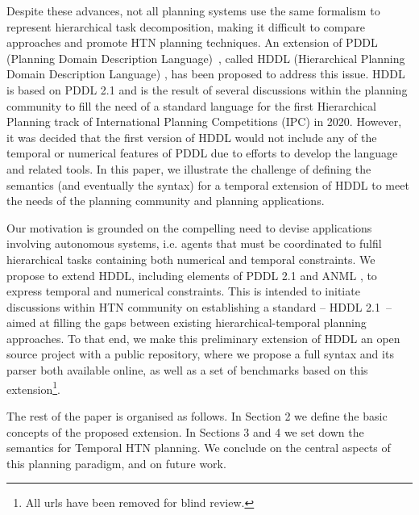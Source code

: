 \documentclass[letterpaper]{article} %
\begin{document}
Despite these advances, not all planning systems use the same formalism to represent hierarchical task decomposition, making it difficult to compare approaches and promote HTN planning techniques. %
An extension of PDDL (Planning Domain Description Language)~\citep{mcdermott98}, called HDDL (Hierarchical Planning Domain Description Language) \citep{holler20}, has been proposed to address this issue. HDDL is based on PDDL 2.1 \citep{fox03} and is the result of several discussions within the planning community \citep{Holler19b} to fill the need of a standard language for the first Hierarchical Planning track of International Planning Competitions (IPC) in 2020. However, it was decided that the first version of HDDL would not include any of the temporal or numerical features of PDDL due to efforts to develop the language and related tools. In this paper, we illustrate the challenge of defining the semantics (and eventually  the syntax) for a temporal extension of HDDL to meet the needs of the planning community and planning applications. %

Our motivation is grounded on the compelling need to devise applications involving autonomous systems, i.e. agents that must be coordinated to fulfil hierarchical tasks containing both numerical and temporal constraints.
We propose to extend HDDL, including elements of PDDL 2.1 and ANML \citep{smith08}, to express temporal and numerical constraints.
This is intended to initiate discussions within HTN community on establishing a standard -- HDDL 2.1~-- aimed at filling the gaps between existing hierarchical-temporal planning approaches. To that end, we make this preliminary extension of HDDL an open source project with a public repository, where we propose a full syntax and its parser both available online, as well as a set of benchmarks based on this extension\footnote{All urls have been removed for blind review.}.

The rest of the paper is organised as follows. In Section 2 we define the basic concepts of the proposed extension. In Sections 3 and 4 we set down the semantics for Temporal HTN planning. We conclude on the central aspects of this planning paradigm, and on future work. %
\end{document}
